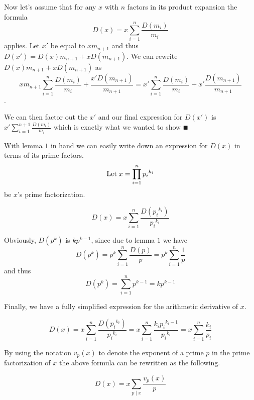 \documentclass[paper=a4,fontsize=paper,12.5pt]{book}
\newcommand{\3}{\vspace*{3mm}}
\begin{document}
\3

Now let's assume that for any $x$ with $n$ factors in its product expansion the formula \[D(x) = x\sum_{i = 1}^n \frac{D(m_i)}{m_i}\]  applies. Let $x'$ be equal to $xm_{n+1}$ and thus $D(x') = D(x)m_{n+1} +xD(m_{n+1})$. We can rewrite $D(x)m_{n+1} +xD(m_{n+1})$ as \[xm_{n+1} \sum_{i = 1}^n \frac{D(m_i)}{m_i}+ \frac{x'D(m_{n+1})}{m_{n+1}} = x' \sum_{i = 1}^n \frac{D(m_i)}{m_i} +x'\frac{D(m_{n+1})}{m_{n+1}} \].

\3

We can then factor out the $x'$ and our final expression for $D(x')$ is $x'\sum_{i = 1}^{n+1} \frac{D(m_i)}{m_i}$ which is exactly what we wanted to show $\QED$

\3

With lemma $1$ in hand we can easily write down an expression for $D(x)$ in terms of its prime factors.\[\text{Let} \hspace*{1mm} x = \prod_{i =1}^n{p_i}^{k_i}\] be $x$'s prime factorization.

\[ D(x) = x\sum_{i = 1}^{n} \frac{D({p_i}^{k_i})}{{p_i}^{k_i}} \]

 \3
 
Obviously, $D(p^k)$ is $kp^{k-1}$, since due to lemma $1$ we have \[D(p^k) = p^k\sum_{i = 1}^n \frac{D(p)}{p} =p^k\sum_{i = 1}^n \frac{1}{p} \] and thus \[D(p^k)  = \sum_{i = 1}^n p^{k-1} = k p^{k-1} \]

\3

Finally, we have a fully simplified expression for the arithmetic derivative of $x$.

\[D(x) = x\sum_{i = 1}^{n} \frac{D({p_i}^{k_i})}{{p_i}^{k_i}} = x\sum_{i = 1}^{n} \frac{{k_i}{p_i}^{k_i -1}}{{p_i}^{k_i}} = x\sum_{i = 1}^{n} \frac{k_i}{p_i}\] 

\3

By using the notation $v_p(x)$ to denote the exponent of a prime $p$ in the prime factorization of $x$ the above formula can be rewritten as the following.

\[D(x) = x\sum_{p \mid x} \frac{v_p(x)}{p}\]
\end{document}
